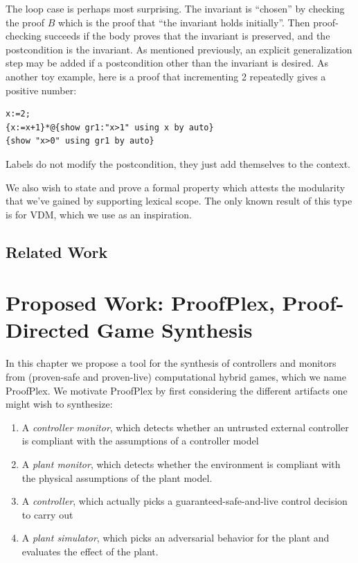 \documentclass[12pt]{cmuthesis}
\theoremstyle{definition}
\theoremstyle{remark}
\newcommand{\ProofPlex}{ProofPlex\xspace}
\begin{document}

The loop case is perhaps most surprising.
The invariant is ``chosen'' by checking the proof $B$ which is the proof that ``the invariant holds initially''.
Then proof-checking succeeds if the body proves that the invariant is preserved, and the postcondition is the invariant.
As mentioned previously, an explicit generalization step may be added if a postcondition other than the invariant is desired.
As another toy example, here is a proof that incrementing 2 repeatedly gives a positive number:
\begin{verbatim}
x:=2;
{x:=x+1}*@{show gr1:"x>1" using x by auto}
{show "x>0" using gr1 by auto}
\end{verbatim}

Labels do not modify the postcondition, they just add themselves to the context.

We also wish to state and prove a formal property which attests the modularity that we've gained by supporting lexical scope.
The only known result of this type is for VDM, which we use as an inspiration.

\section{Related Work}
\label{sec:kaisar-relwork}

\chapter{Proposed Work: \ProofPlex, Proof-Directed Game Synthesis}
\label{ch:proofplex}
In this chapter we propose a tool for the synthesis of controllers and monitors from (proven-safe and proven-live) computational hybrid games, which we name \ProofPlex.
We motivate \ProofPlex by first considering the different artifacts one might wish to synthesize:
\begin{enumerate}
\item A \emph{controller monitor}, which detects whether an untrusted external controller is compliant with the assumptions of a controller model
\item A \emph{plant monitor}, which detects whether the environment is compliant with the physical assumptions of the plant model.
\item A \emph{controller}, which actually picks a guaranteed-safe-and-live control decision to carry out
\item A \emph{plant simulator}, which picks an adversarial behavior for the plant and evaluates the effect of the plant.
\end{enumerate}
\end{document}
